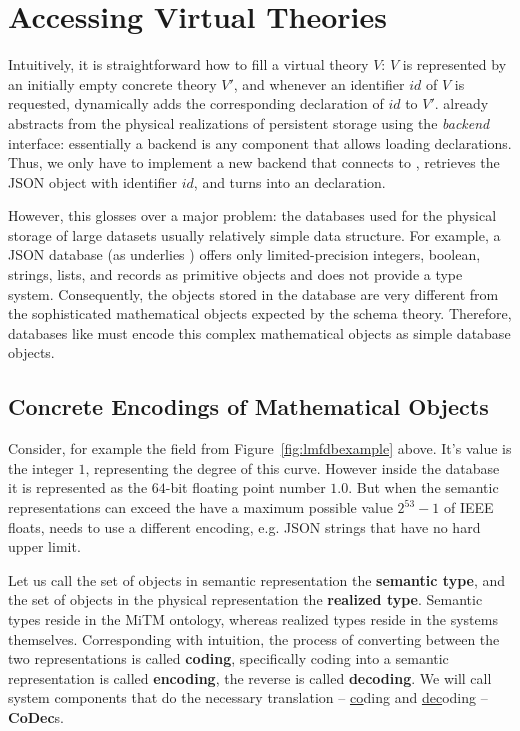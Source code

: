\section{Accessing Virtual Theories}\label{sec:access}

Intuitively, it is straightforward how to fill a virtual theory $V$: $V$ is represented by an initially empty concrete theory $V'$, and whenever an identifier $id$ of $V$ is requested, \mmt dynamically adds the corresponding declaration of $id$ to $V'$.
\mmt already abstracts from the physical realizations of persistent storage using the \emph{backend} interface: essentially a backend is any component that allows loading declarations.
Thus, we only have to implement a new backend that connects to \lmfdb, retrieves the JSON object with identifier $id$, and turns into an \ommt declaration.

However, this glosses over a major problem: the databases used for the physical storage of large datasets usually relatively simple data structure.
For example, a JSON database (as underlies \lmfdb) offers only limited-precision integers, boolean, strings, lists, and records as primitive objects and does not provide a type system.
Consequently, the objects stored in the database are very different from the sophisticated mathematical objects expected by the schema theory.
Therefore, databases like \lmfdb must encode this complex mathematical objects as simple database objects.

\subsection{Concrete Encodings of Mathematical Objects}\label{sec:vt:translation}

Consider, for example the  field from Figure~\ref{fig:lmfdbexample} above. 
It's value is the integer $1$, representing the degree of this curve. 
However inside the database it is represented as the  $64$-bit floating point number $1.0$. 
But when the semantic representations can exceed the have a maximum possible value $2^{53}-1$ of IEEE floats, \lmfdb needs to use a different encoding, e.g. JSON strings that have no hard upper limit.

Let us call the set of objects in semantic representation the \textbf{semantic type}, and the set of objects in the physical representation the \textbf{realized type}. 
Semantic types reside in the MiTM ontology, whereas realized types reside in the systems themselves. 
Corresponding with intuition, the process of converting between the two representations is called \textbf{coding}, specifically coding into a semantic representation is called \textbf{encoding}, the reverse is called \textbf{decoding}. 
We will call system components that do the necessary translation -- \underline{co}ding and \underline{dec}oding -- \textbf{CoDec}s. 

